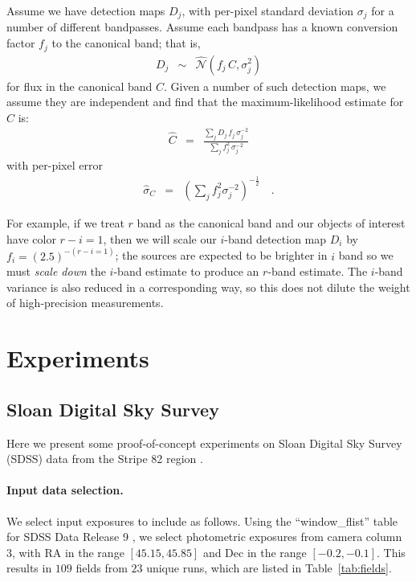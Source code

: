 \documentclass[letterpaper,preprint]{aastex}
\newcommand{\tabref}[1]{\mbox{Table~\ref{#1}}}
\newcommand{\drawnfrom}{\sim}
\newcommand{\gaussianN}{\mathcal{N}}
\newcommand{\gaussx}[1]{\hat{\gaussianN}\!\left(#1\right)}
\begin{document}
\newcommand{\sigdj}{\sigma_{j}}

Assume we have detection maps $D_j$, with per-pixel standard deviation
$\sigdj$ for a number of different bandpasses.  Assume each
bandpass has a known conversion factor $f_j$ to the canonical band;
that is,
\begin{eqnarray}
  D_j & \drawnfrom & \gaussx{f_j \, C, \sigdj^2}
\end{eqnarray}
for flux in the canonical band $C$.  Given a number of such detection
maps, we assume they are independent and find that the
maximum-likelihood estimate for $C$ is:
\begin{eqnarray}
  \hat{C} &=& 
  \frac{\sum_j D_j \, f_j \, \sigdj^{-2}}%
       {\sum_j f_j^2 \, \sigdj^{-2}}
\end{eqnarray}
with per-pixel error
\begin{eqnarray}
  \hat{\sigma}_C &=& \left( \sum_j f_j^2 \sigdj^{-2} \right)^{-\frac{1}{2}}
  \quad .
\end{eqnarray}


For example, if we treat $r$ band as the canonical band and our
objects of interest have color $r-i = 1$, then we will scale our
$i$-band detection map $D_i$ by $f_i = (2.5)^{-(r-i = 1)}$; the
sources are expected to be brighter in $i$ band so we must \emph{scale
  down} the $i$-band estimate to produce an $r$-band estimate.  The
$i$-band variance is also reduced in a corresponding way, so this does
not dilute the weight of high-precision measurements.




\section{Experiments}

\subsection{Sloan Digital Sky Survey}

Here we present some proof-of-concept experiments on Sloan Digital Sky
Survey (SDSS) data from the Stripe 82 region \cite{sdss}.


\paragraph{Input data selection.}
We select input exposures to include as follows.  Using the
``window\_flist'' table for SDSS Data Release 9 \cite{dr9}, we select
photometric exposures from camera column 3, with RA in the range
$[45.15, 45.85]$ and Dec in the range $[-0.2, -0.1]$.  This results in
$109$ fields from $23$ unique runs, which are listed in
\tabref{tab:fields}.
\end{document}
